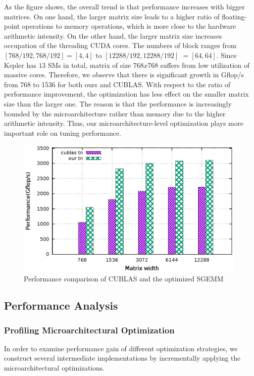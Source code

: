 \documentclass{sig-alternate-05-2015}
\begin{document}
As the figure shows, the overall trend is that performance increases with bigger matrices. On one hand, the larger matrix size leads to a higher ratio of floating-point operations to memory operations, which is more close to the hardware arithmetic intensity. On the other hand, the larger matrix size increases occupation of the threading CUDA cores. The numbers of block ranges from $[768/192,768/192]=[4,4]$ to $[12288/192, 12288/192]$ $=[64,64]$. Since Kepler has $13$ SMs in total, matrix of size $768x768$ suffers from low utilization of massive cores. Therefore, we observe that there is significant growth in Gflop/s from 768 to 1536 for both ours and CUBLAS. With respect to the ratio of performance improvement, the optimization has less effect on the smaller matrix size than the larger one. The reason is that the performance is increasingly bounded by the microarchitecture rather than memory due to the higher arithmetic intensity. Thus, our microarchitecture-level optimization plays more important role on tuning performance.  

\begin{figure}[htbp]
\begin{center}
\includegraphics[scale=0.6]{sgemm_tn}
\caption{Performance comparison of CUBLAS and the optimized SGEMM }
\label{fig:sgemm_tn}
\end{center}
\end{figure}

\subsection{Performance Analysis}

\subsubsection{Profiling Microarchitectural Optimization}
In order to examine performance gain of different optimization strategies, we construct several intermediate implementations by incrementally applying the microarchitectural optimizations. 
\end{document}
